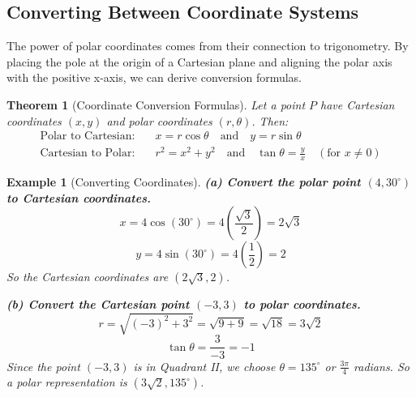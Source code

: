 \documentclass[12pt]{article}
\newtheorem{theorem}{Theorem}
\newtheorem{example}{Example}
\begin{document}
\subsection{Converting Between Coordinate Systems}

The power of polar coordinates comes from their connection to trigonometry. By placing the pole at the origin of a Cartesian plane and aligning the polar axis with the positive x-axis, we can derive conversion formulas.

\begin{center}
\end{center}

\begin{theorem}[Coordinate Conversion Formulas]
Let a point $P$ have Cartesian coordinates $(x,y)$ and polar coordinates $(r, \theta)$. Then:
\begin{align}
    \text{Polar to Cartesian:} \quad & x = r \cos\theta \quad \text{and} \quad y = r \sin\theta \\
    \text{Cartesian to Polar:} \quad & r^2 = x^2 + y^2 \quad \text{and} \quad \tan\theta = \frac{y}{x} \quad (\text{for } x \neq 0)
\end{align}
\end{theorem}

\begin{example}[Converting Coordinates]
\textbf{(a) Convert the polar point $(4, 30^\circ)$ to Cartesian coordinates.}
$$ x = 4 \cos(30^\circ) = 4 \left(\frac{\sqrt{3}}{2}\right) = 2\sqrt{3} $$
$$ y = 4 \sin(30^\circ) = 4 \left(\frac{1}{2}\right) = 2 $$
So the Cartesian coordinates are $(2\sqrt{3}, 2)$.

\textbf{(b) Convert the Cartesian point $(-3, 3)$ to polar coordinates.}
$$ r = \sqrt{(-3)^2 + 3^2} = \sqrt{9+9} = \sqrt{18} = 3\sqrt{2} $$
$$ \tan\theta = \frac{3}{-3} = -1 $$
Since the point $(-3,3)$ is in Quadrant II, we choose $\theta = 135^\circ$ or $\frac{3\pi}{4}$ radians. So a polar representation is $(3\sqrt{2}, 135^\circ)$.
\end{example}
\end{document}
